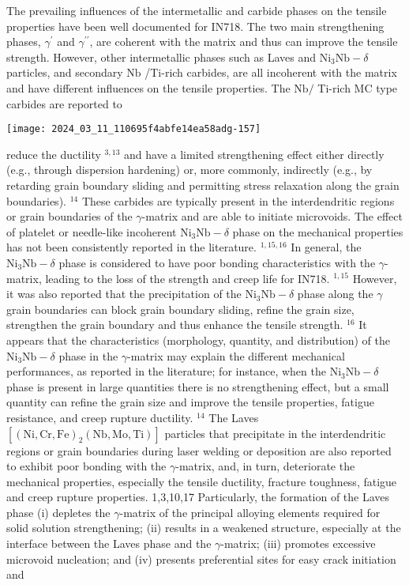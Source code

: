 \documentclass[10pt]{article}
\begin{document}
The prevailing influences of the intermetallic and carbide phases on the tensile properties have been well documented for IN718. The two main strengthening phases, $\gamma^{\prime}$ and $\gamma^{\prime \prime}$, are coherent with the matrix and thus can improve the tensile strength. However, other intermetallic phases such as Laves and $\mathrm{Ni}_{3} \mathrm{Nb}-\delta$ particles, and secondary $\mathrm{Nb}$ /Ti-rich carbides, are all incoherent with the matrix and have different influences on the tensile properties. The $\mathrm{Nb} /$ Ti-rich MC type carbides are reported to

\begin{center}
\texttt{[image: 2024\_03\_11\_110695f4abfe14ea58adg-157]}
\end{center}

reduce the ductility ${ }^{3,13}$ and have a limited strengthening effect either directly (e.g., through dispersion hardening) or, more commonly, indirectly (e.g., by retarding grain boundary sliding and permitting stress relaxation along the grain boundaries). ${ }^{14}$ These carbides are typically present in the interdendritic regions or grain boundaries of the $\gamma$-matrix and are able to initiate microvoids. The effect of platelet or needle-like incoherent $\mathrm{Ni}_{3} \mathrm{Nb}-\delta$ phase on the mechanical properties has not been consistently reported in the literature. ${ }^{1,15,16}$ In general, the $\mathrm{Ni}_{3} \mathrm{Nb}-\delta$ phase is considered to have poor bonding characteristics with the $\gamma$-matrix, leading to the loss of the strength and creep life for IN718. ${ }^{1,15}$ However, it was also reported that the precipitation of the $\mathrm{Ni}_{3} \mathrm{Nb}-\delta$ phase along the $\gamma$ grain boundaries can block grain boundary sliding, refine the grain size, strengthen the grain boundary and thus enhance the tensile strength. ${ }^{16}$ It appears that the characteristics (morphology, quantity, and distribution) of the $\mathrm{Ni}_{3} \mathrm{Nb}-\delta$ phase in the $\gamma$-matrix may explain the different mechanical performances, as reported in the literature; for instance, when the $\mathrm{Ni}_{3} \mathrm{Nb}-\delta$ phase is present in large quantities there is no strengthening effect, but a small quantity can refine the grain size and improve the tensile properties, fatigue resistance, and creep rupture ductility. ${ }^{14}$ The Laves $\left[(\mathrm{Ni}, \mathrm{Cr}, \mathrm{Fe})_{2}(\mathrm{Nb}, \mathrm{Mo}, \mathrm{Ti})\right]$ particles that precipitate in the interdendritic regions or grain boundaries during laser welding or deposition are also reported to exhibit poor bonding with the $\gamma$-matrix, and, in turn, deteriorate the mechanical properties, especially the tensile ductility, fracture toughness, fatigue and creep rupture properties. 1,3,10,17 Particularly, the formation of the Laves phase (i) depletes the $\gamma$-matrix of the principal alloying elements required for solid solution strengthening; (ii) results in a weakened structure, especially at the interface between the Laves phase and the $\gamma$-matrix; (iii) promotes excessive microvoid nucleation; and (iv) presents preferential sites for easy crack initiation and 
\end{document}
